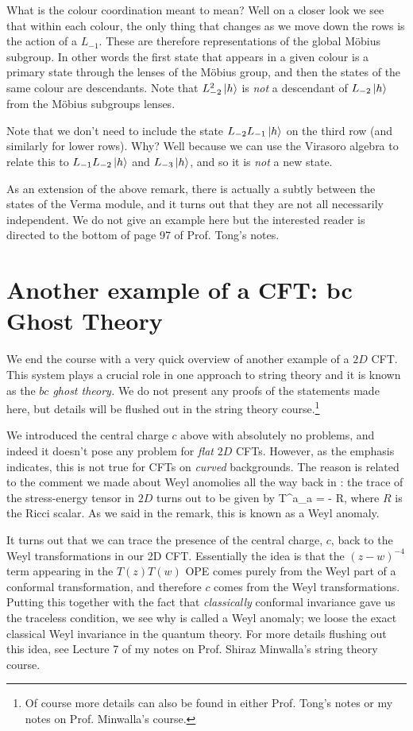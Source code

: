 What is the colour coordination meant to mean? Well on a closer look we see that within each colour, the only thing that changes as we move down the rows is the action of a $L_{-1}$. These are therefore representations of the global M\"{o}bius subgroup. In other words the first state that appears in a given colour is a primary state through the lenses of the M\"{o}bius group, and then the states of the same colour are descendants. Note that $L_{-2}^2\ket{h}$ is \textit{not} a descendant of $L_{-2}\ket{h}$ from the M\"{o}bius subgroups lenses.

\br 
    Note that we don't need to include the state $L_{-2}L_{-1}\ket{h}$ on the third row (and similarly for lower rows). Why? Well because we can use the Virasoro algebra to relate this to $L_{-1}L_{-2}\ket{h}$ and $L_{-3}\ket{h}$, and so it is \textit{not} a new state. 
\er 

\badr 
    As an extension of the above remark, there is actually a subtly between the states of the Verma module, and it turns out that they are not all necessarily independent. We do not give an example here but the interested reader is directed to the bottom of page 97 of Prof. Tong's notes. 
\eadr 

\section{Another example of a CFT: bc Ghost Theory}

We end the course with a very quick overview of another example of a $2D$ CFT. This system plays a crucial role in one approach to string theory and it is known as the \textit{$bc$ ghost theory.} We do not present any proofs of the statements made here, but details will be flushed out in the string theory course.\footnote{Of course more details can also be found in either Prof. Tong's notes or my notes on Prof. Minwalla's course.}

We introduced the central charge $c$ above with absolutely no problems, and indeed it doesn't pose any problem for \textit{flat} $2D$ CFTs. However, as the emphasis indicates, this is not true for CFTs on \textit{curved} backgrounds. The reason is related to the comment we made about Weyl anomolies all the way back in : the trace of the stress-energy tensor in $2D$ turns out to be given by
\be 
\label{eqn:WeylAnom}
    {T^a}_{a} = - R,
\ee 
where $R$ is the Ricci scalar. As we said in the remark, this is known as a Weyl anomaly. 


\badr 
    It turns out that we can trace the presence of the central charge, $c$, back to the Weyl transformations in our 2D CFT. Essentially the idea is that the $(z-w)^{-4}$ term appearing in the $T(z)T(w)$ OPE comes purely from the Weyl part of a conformal transformation, and therefore $c$ comes from the Weyl transformations. Putting this together with the fact that \textit{classically} conformal invariance gave us the traceless condition, we see why  is called a Weyl anomaly; we loose the exact classical Weyl invariance in the quantum theory. For more details flushing out this idea, see Lecture 7 of my notes on Prof. Shiraz Minwalla's string theory course.
\eadr 

